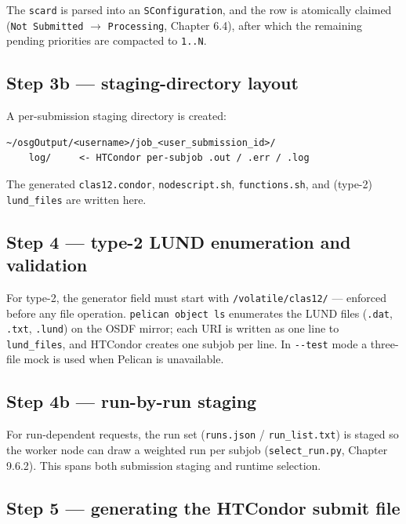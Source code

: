 The \texttt{scard} is parsed into an \texttt{SConfiguration}, and the row is atomically claimed (\texttt{Not
Submitted} $\rightarrow$ \texttt{Processing}, Chapter 6.4), after which the remaining pending priorities are
compacted to \texttt{1.\allowbreak{}.\allowbreak{}N}.

\subsection{Step 3b --- staging-directory layout}

A per-submission staging directory is created:

\begin{lstlisting}
~/osgOutput/<username>/job_<user_submission_id>/
    log/     <- HTCondor per-subjob .out / .err / .log
\end{lstlisting}

The generated \texttt{clas12.\allowbreak{}condor}, \texttt{nodescript.\allowbreak{}sh},
\texttt{functions.\allowbreak{}sh}, and (type-2) \texttt{lund\_\allowbreak{}files} are written here.

\subsection{Step 4 --- type-2 LUND enumeration and validation}

For type-2, the generator field must start with
\texttt{/\allowbreak{}volatile/\allowbreak{}clas12/\allowbreak{}} --- enforced before any file operation.
\texttt{pelican object ls} enumerates the LUND files (\texttt{.\allowbreak{}dat}, \texttt{.\allowbreak{}txt},
\texttt{.\allowbreak{}lund}) on the OSDF mirror; each URI is written as one line to
\texttt{lund\_\allowbreak{}files}, and HTCondor creates one subjob per line. In
\texttt{-\allowbreak{}-\allowbreak{}test} mode a three-file mock is used when Pelican is unavailable.

\subsection{Step 4b --- run-by-run staging}

For run-dependent requests, the run set (\texttt{runs.\allowbreak{}json} /
\texttt{run\_\allowbreak{}list.\allowbreak{}txt}) is staged so the worker node can draw a weighted run per
subjob (\texttt{select\_\allowbreak{}run.\allowbreak{}py}, Chapter 9.6.2). This spans both submission staging
and runtime selection.

\subsection{Step 5 --- generating the HTCondor submit file}


